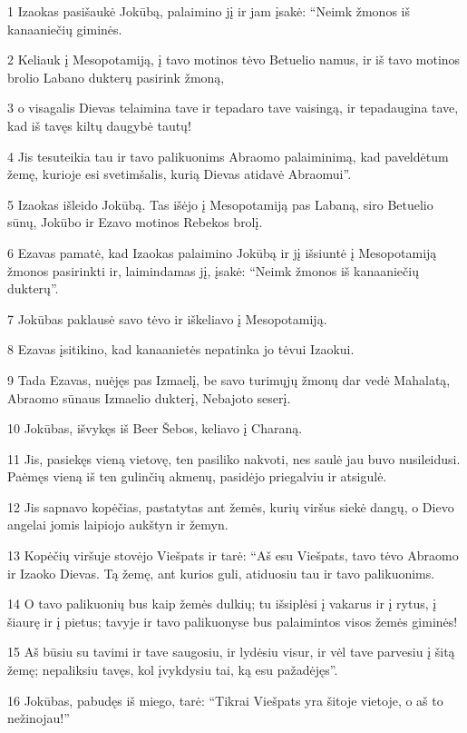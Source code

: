 \par 1 Izaokas pasišaukė Jokūbą, palaimino jį ir jam įsakė: “Neimk žmonos iš kanaaniečių giminės. 
\par 2 Keliauk į Mesopotamiją, į tavo motinos tėvo Betuelio namus, ir iš tavo motinos brolio Labano dukterų pasirink žmoną, 
\par 3 o visagalis Dievas telaimina tave ir tepadaro tave vaisingą, ir tepadaugina tave, kad iš tavęs kiltų daugybė tautų! 
\par 4 Jis tesuteikia tau ir tavo palikuonims Abraomo palaiminimą, kad paveldėtum žemę, kurioje esi svetimšalis, kurią Dievas atidavė Abraomui”. 
\par 5 Izaokas išleido Jokūbą. Tas išėjo į Mesopotamiją pas Labaną, siro Betuelio sūnų, Jokūbo ir Ezavo motinos Rebekos brolį. 
\par 6 Ezavas pamatė, kad Izaokas palaimino Jokūbą ir jį išsiuntė į Mesopotamiją žmonos pasirinkti ir, laimindamas jį, įsakė: “Neimk žmonos iš kanaaniečių dukterų”. 
\par 7 Jokūbas paklausė savo tėvo ir iškeliavo į Mesopotamiją. 
\par 8 Ezavas įsitikino, kad kanaanietės nepatinka jo tėvui Izaokui. 
\par 9 Tada Ezavas, nuėjęs pas Izmaelį, be savo turimųjų žmonų dar vedė Mahalatą, Abraomo sūnaus Izmaelio dukterį, Nebajoto seserį. 
\par 10 Jokūbas, išvykęs iš Beer Šebos, keliavo į Charaną. 
\par 11 Jis, pasiekęs vieną vietovę, ten pasiliko nakvoti, nes saulė jau buvo nusileidusi. Paėmęs vieną iš ten gulinčių akmenų, pasidėjo priegalviu ir atsigulė. 
\par 12 Jis sapnavo kopėčias, pastatytas ant žemės, kurių viršus siekė dangų, o Dievo angelai jomis laipiojo aukštyn ir žemyn. 
\par 13 Kopėčių viršuje stovėjo Viešpats ir tarė: “Aš esu Viešpats, tavo tėvo Abraomo ir Izaoko Dievas. Tą žemę, ant kurios guli, atiduosiu tau ir tavo palikuonims. 
\par 14 O tavo palikuonių bus kaip žemės dulkių; tu išsiplėsi į vakarus ir į rytus, į šiaurę ir į pietus; tavyje ir tavo palikuonyse bus palaimintos visos žemės giminės! 
\par 15 Aš būsiu su tavimi ir tave saugosiu, ir lydėsiu visur, ir vėl tave parvesiu į šitą žemę; nepaliksiu tavęs, kol įvykdysiu tai, ką esu pažadėjęs”. 
\par 16 Jokūbas, pabudęs iš miego, tarė: “Tikrai Viešpats yra šitoje vietoje, o aš to nežinojau!” 
